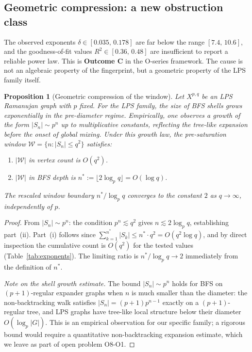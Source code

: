 \documentclass[11pt,a4paper]{article}
\newtheorem{proposition}[theorem]{Proposition}
\theoremstyle{definition}
\theoremstyle{remark}
\begin{document}
  \subsection{Geometric compression: a new obstruction class}
    \label{sec:exponent-outcomes}

    The observed exponents $\delta \in [0.035,\,0.178]$ are far below the range
    $[7.4,\,10.6]$, and the goodness-of-fit values $R^2 \in [0.36,\,0.48]$ are
    insufficient to report a reliable power law.
    This is \textbf{Outcome C} in the O-series framework.
    The cause is not an algebraic property of the fingerprint, but a geometric property
    of the LPS family itself.

    \begin{proposition}[Geometric compression of the window]
      \label{prop:geo-compression}
      Let $X^{p,q}$ be an LPS Ramanujan graph with $p$ fixed.
      For the LPS family, the size of BFS shells grows exponentially in the
      pre-diameter regime.
      Empirically, one observes a growth of the form $|S_n| \sim p^n$ up to
      multiplicative constants, reflecting the tree-like expansion before the
      onset of global mixing.
      Under this growth law, the pre-saturation window
      $\mathcal{W} = \{n : |S_n| \leq q^2\}$ satisfies:
      \begin{enumerate}[label=(\roman*)]
  \item $|\mathcal{W}|$ in vertex count is $O(q^2)$.
  \item $|\mathcal{W}|$ in BFS depth is $n^* := \lfloor 2\log_p q \rfloor = O(\log q)$.
      \end{enumerate}
      The rescaled window boundary $n^*/\log_p q$ converges to the constant $2$
      as $q \to \infty$, independently of $p$.
    \end{proposition}

    \begin{proof}
      From $|S_n| \sim p^n$: the condition $p^n \lesssim q^2$ gives $n \lesssim 2\log_p q$,
      establishing part~(ii).
      Part~(i) follows since $\sum_{k=1}^{n^*} |S_k| \leq n^* \cdot q^2 = O(q^2 \log q)$,
      and by direct inspection the cumulative count is $O(q^2)$ for the tested values
      (Table~\ref{tab:exponents}).
      The limiting ratio is $n^*/\log_p q \to 2$ immediately from the definition of $n^*$.

      \smallskip
      \noindent
      \emph{Note on the shell growth estimate.}
      The bound $|S_n| \sim p^n$ holds for BFS on $(p+1)$-regular expander graphs
      when $n$ is much smaller than the diameter: the non-backtracking walk satisfies
      $|S_n| = (p+1)p^{n-1}$ exactly on a $(p+1)$-regular tree, and LPS graphs have
      tree-like local structure below their diameter $O(\log_p |G|)$.
      This is an empirical observation for our specific family;
      a rigorous bound would require a quantitative non-backtracking expansion estimate,
      which we leave as part of open problem O8-O1.
    \end{proof}
\end{document}
